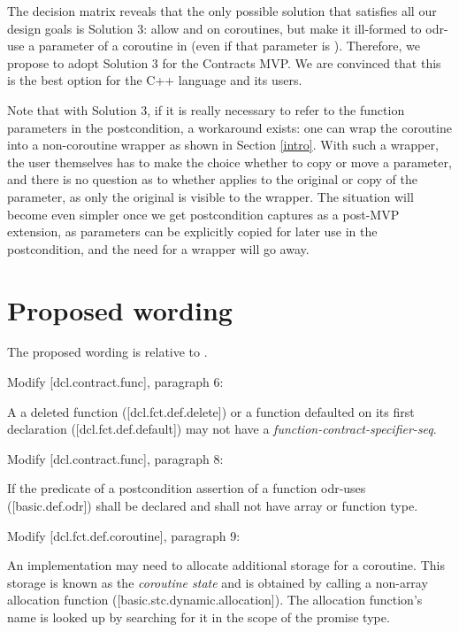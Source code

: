 The decision matrix reveals that the only possible solution that satisfies all our design goals is Solution 3: allow  and  on coroutines, but make it ill-formed to odr-use a parameter of a coroutine in  (even if that parameter is ). Therefore, we propose to adopt Solution 3 for the Contracts MVP. We are convinced that this is the best option for the C++ language and its users.

Note that with Solution 3, if it is really necessary to refer to the function parameters in the postcondition, a workaround exists: one can wrap the coroutine into a non-coroutine wrapper as shown in Section \ref{intro}. With such a wrapper, the user themselves has to make the choice whether to copy or move a parameter, and there is no question as to whether  applies to the original or copy of the parameter, as only the original is visible to the wrapper. The situation will become even simpler once we get postcondition captures \cite{P3098R0} as a post-MVP extension, as parameters can be explicitly copied for later use in the postcondition, and the need for a wrapper will go away.

\section{Proposed wording}

The proposed wording is relative to \cite{P2900R8}.

Modify [dcl.contract.func], paragraph 6:
\begin{adjustwidth}{0.5cm}{0.5cm}
A a deleted function ([dcl.fct.def.delete])\removed{,} or a function defaulted on its first declaration ([dcl.fct.def.default]) may not have a \emph{function-contract-specifier-seq}.
\end{adjustwidth}

Modify [dcl.contract.func], paragraph 8:
\begin{adjustwidth}{0.5cm}{0.5cm}
If the predicate of a postcondition assertion of a function odr-uses ([basic.def.odr])  shall be declared  and shall not have array or function type.
\end{adjustwidth}

Modify [dcl.fct.def.coroutine], paragraph 9:
\begin{adjustwidth}{0.5cm}{0.5cm}
An implementation may need to allocate additional storage for a coroutine. This storage is known as the \emph{coroutine state} and is obtained by calling a non-array allocation function ([basic.stc.dynamic.allocation]). The allocation function's name is looked up by searching for it in the scope of the promise type.
\end{adjustwidth}

